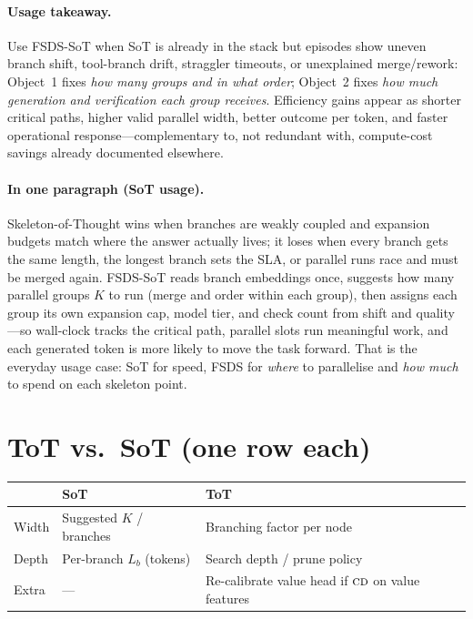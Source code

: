 \documentclass[11pt]{article}
\newcommand{\CD}{\textsc{cd}}
\begin{document}
\paragraph{Usage takeaway.} Use FSDS-SoT when SoT is already in the stack but
episodes show uneven branch shift, tool-branch drift, straggler timeouts, or
unexplained merge/rework: Object~1 fixes \emph{how many groups and in what order};
Object~2 fixes \emph{how much generation and verification each group receives}.
Efficiency gains appear as shorter critical paths, higher valid parallel width,
better outcome per token, and faster operational response---complementary to,
not redundant with, compute-cost savings already documented elsewhere.

\paragraph{In one paragraph (SoT usage).}
Skeleton-of-Thought wins when branches are weakly coupled and expansion budgets
match where the answer actually lives; it loses when every branch gets the same
length, the longest branch sets the SLA, or parallel runs race and must be merged
again. FSDS-SoT reads branch embeddings once, suggests how many parallel groups
$K$ to run (merge and order within each group), then assigns each group its own
expansion cap, model tier, and check count from shift and quality---so wall-clock
tracks the critical path, parallel slots run meaningful work, and each generated
token is more likely to move the task forward. That is the everyday usage case:
SoT for speed, FSDS for \emph{where} to parallelise and \emph{how much} to spend
on each skeleton point.

\section{ToT vs.\ SoT (one row each)}
\label{sec:tot-sot}

\begin{table}[h]
\centering
\small
\begin{tabular}{lll}
\toprule
 & SoT & ToT \\
\midrule
Width & Suggested $K$ / branches & Branching factor per node \\
Depth & Per-branch $L_b$ (tokens) & Search depth / prune policy \\
Extra & --- & Re-calibrate value head if $\CD$ on value features \\
\bottomrule
\end{tabular}
\end{table}
\end{document}

